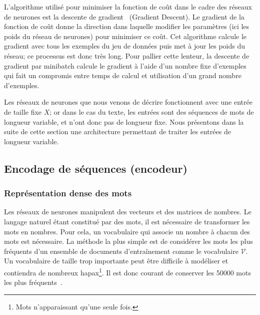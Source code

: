L'algorithme utilisé pour minimiser la fonction de coût dans le cadre des réseaux de neurones est la descente de gradient~\cite{curry_method_1944} (Gradient Descent).
Le gradient de la fonction de coût donne la direction dans laquelle modifier les paramètres (ici les poids du réseau de neurones) pour minimiser ce coût.
Cet algorithme calcule le gradient avec tous les exemples du jeu de données puis met à jour les poids du réseau; ce processus est donc très long. Pour pallier cette lenteur, la descente de gradient par minibatch calcule le gradient à l'aide d'un nombre fixe d'exemples qui fait un compromis entre temps de calcul et utilisation d'un grand nombre d'exemples.

Les réseaux de neurones que nous venons de décrire fonctionnent avec une entrée de taille fixe $X$; or dans le cas du texte, les entrées sont des séquences de mots de longueur variable, et n'ont donc pas de longueur fixe. Nous présentons dans la suite de cette section une architecture permettant de traiter les entrées de longueur variable.

\subsection{Encodage de séquences (encodeur)}
\label{sub:encoding}

\subsubsection{Représentation dense des mots}
\label{sec:word_embedding}

Les réseaux de neurones manipulent des vecteurs et des matrices de nombres. Le langage naturel étant constitué par des mots, il est nécessaire de transformer les mots en nombres.
Pour cela, un vocabulaire qui associe un nombre à chacun des mots est nécessaire. La méthode la plus simple est de considérer les mots les plus fréquents d'un ensemble de documents d'entraînement comme le vocabulaire $\mathcal{V}$.
Un vocabulaire de taille trop importante peut être difficile à modéliser et contiendra de nombreux hapax\footnote{Mots n'apparaissant qu'une seule fois.}. Il est donc courant de conserver les \num{50 000} mots les plus fréquents~\cite{meng_deep_2017,yuan_one_2020,ye_one2set_2021}.


